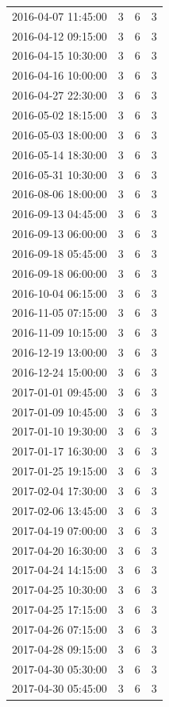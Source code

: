 \begin{tabular}{lrrr}
2016-04-07 11:45:00 & 3 & 6 & 3 \\
2016-04-12 09:15:00 & 3 & 6 & 3 \\
2016-04-15 10:30:00 & 3 & 6 & 3 \\
2016-04-16 10:00:00 & 3 & 6 & 3 \\
2016-04-27 22:30:00 & 3 & 6 & 3 \\
2016-05-02 18:15:00 & 3 & 6 & 3 \\
2016-05-03 18:00:00 & 3 & 6 & 3 \\
2016-05-14 18:30:00 & 3 & 6 & 3 \\
2016-05-31 10:30:00 & 3 & 6 & 3 \\
2016-08-06 18:00:00 & 3 & 6 & 3 \\
2016-09-13 04:45:00 & 3 & 6 & 3 \\
2016-09-13 06:00:00 & 3 & 6 & 3 \\
2016-09-18 05:45:00 & 3 & 6 & 3 \\
2016-09-18 06:00:00 & 3 & 6 & 3 \\
2016-10-04 06:15:00 & 3 & 6 & 3 \\
2016-11-05 07:15:00 & 3 & 6 & 3 \\
2016-11-09 10:15:00 & 3 & 6 & 3 \\
2016-12-19 13:00:00 & 3 & 6 & 3 \\
2016-12-24 15:00:00 & 3 & 6 & 3 \\
2017-01-01 09:45:00 & 3 & 6 & 3 \\
2017-01-09 10:45:00 & 3 & 6 & 3 \\
2017-01-10 19:30:00 & 3 & 6 & 3 \\
2017-01-17 16:30:00 & 3 & 6 & 3 \\
2017-01-25 19:15:00 & 3 & 6 & 3 \\
2017-02-04 17:30:00 & 3 & 6 & 3 \\
2017-02-06 13:45:00 & 3 & 6 & 3 \\
2017-04-19 07:00:00 & 3 & 6 & 3 \\
2017-04-20 16:30:00 & 3 & 6 & 3 \\
2017-04-24 14:15:00 & 3 & 6 & 3 \\
2017-04-25 10:30:00 & 3 & 6 & 3 \\
2017-04-25 17:15:00 & 3 & 6 & 3 \\
2017-04-26 07:15:00 & 3 & 6 & 3 \\
2017-04-28 09:15:00 & 3 & 6 & 3 \\
2017-04-30 05:30:00 & 3 & 6 & 3 \\
2017-04-30 05:45:00 & 3 & 6 & 3 \\

\end{tabular}
